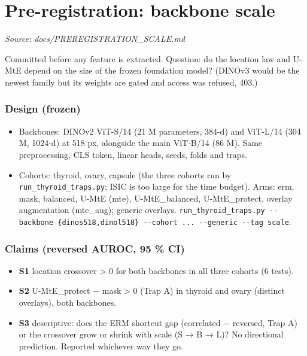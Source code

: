 \section{Pre-registration: backbone scale}\label{doc:PREREGISTRATION_SCALE}
\noindent\textit{Source: docs/PREREGISTRATION\_SCALE.md}

{\small
Committed before any feature is extracted. Question: do the location law and U-MtE depend on the size of the frozen
foundation model? (DINOv3 would be the newest family but its weights are gated and access was refused, 403.)

\subsubsection{Design (frozen)}\label{design-frozen}

\begin{itemize}

\item
  Backbones: DINOv2 ViT-S/14 (21 M parameters, 384-d) and ViT-L/14 (304 M, 1024-d) at 518 px, alongside the main
  ViT-B/14 (86 M). Same preprocessing, CLS token, linear heads, seeds, folds and traps.
\item
  Cohorts: thyroid, ovary, capsule (the three cohorts run by \texttt{run\_thyroid\_traps.py}; ISIC is too large for the time
  budget). Arms: erm, mask, balanced, U-MtE (mte), U-MtE\_balanced, U-MtE\_protect, overlay augmentation (mte\_aug);
  generic overlays. \texttt{run\_thyroid\_traps.py\ -\/-backbone\ \{dinos518,dinol518\}\ -\/-cohort\ ...\ -\/-generic\ -\/-tag\ scale}.
\end{itemize}

\subsubsection{Claims (reversed AUROC, 95 \% CI)}\label{claims-reversed-auroc-95--ci}

\begin{itemize}

\item
  \textbf{S1} location crossover \textgreater{} 0 for both backbones in all three cohorts (6 tests).
\item
  \textbf{S2} U-MtE\_protect − mask \textgreater{} 0 (Trap A) in thyroid and ovary (distinct overlays), both backbones.
\item
  \textbf{S3} descriptive: does the ERM shortcut gap (correlated − reversed, Trap A) or the crossover grow or shrink with
  scale (S → B → L)? No directional prediction.
  Reported whichever way they go.
\end{itemize}

}
